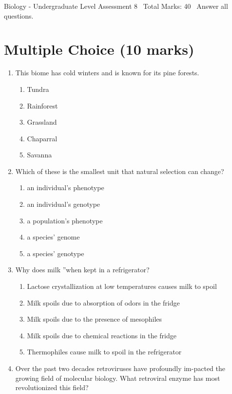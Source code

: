 \documentclass[12pt]{article}
\begin{document}
\begin{center}
Biology - Undergraduate Level Assessment 8 \
Total Marks: 40 \
Answer all questions.
\end{center}

\section*{Multiple Choice (10 marks)}
\begin{enumerate}[label=\arabic*.]
\item This biome has cold winters and is known for its pine forests.
\begin{enumerate}[label=(\alph*)]
    \item Tundra
    \item Rainforest
    \item Grassland
    \item Chaparral
    \item Savanna
\end{enumerate}
\item Which of these is the smallest unit that natural selection can change?
\begin{enumerate}[label=(\alph*)]
    \item an individual's phenotype
    \item an individual's genotype
    \item a population's phenotype
    \item a species' genome
    \item a species' genotype
\end{enumerate}
\item Why does milk \textquotedblleftspoil\textquotedblright when kept in a refrigerator?
\begin{enumerate}[label=(\alph*)]
    \item Lactose crystallization at low temperatures causes milk to spoil
    \item Milk spoils due to absorption of odors in the fridge
    \item Milk spoils due to the presence of mesophiles
    \item Milk spoils due to chemical reactions in the fridge
    \item Thermophiles cause milk to spoil in the refrigerator
\end{enumerate}
\item Over the past two decades retroviruses have profoundly im-pacted the growing field of molecular biology. What retroviral enzyme has most revolutionized this field?

\end{enumerate}
\end{document}
